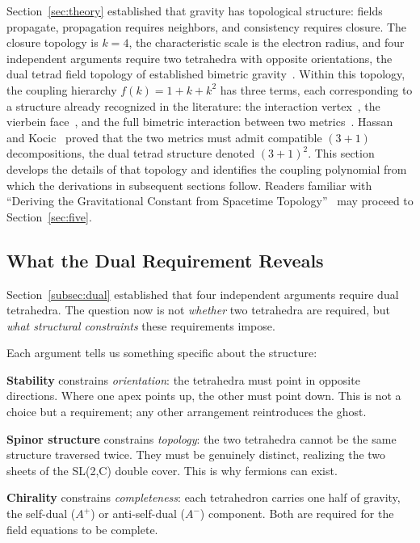 \documentclass[aps,prd,preprint,superscriptaddress,showpacs,preprintnumbers,amsmath,amssymb,nofootinbib]{revtex4-2}
\begin{document}
Section~\ref{sec:theory} established that gravity has topological structure: fields propagate, propagation requires neighbors, and consistency requires closure. The closure topology is $k = 4$, the characteristic scale is the electron radius, and four independent arguments require two tetrahedra with opposite orientations, the dual tetrad field topology of established bimetric gravity~\cite{hassan2012}. Within this topology, the coupling hierarchy $f(k) = 1 + k + k^2$ has three terms, each corresponding to a structure already recognized in the literature: the interaction vertex~\cite{hinterbichler2012}, the vierbein face~\cite{mtw1973}, and the full bimetric interaction between two metrics~\cite{hassan2012}. Hassan and Kocic~\cite{hassankocic2018} proved that the two metrics must admit compatible $(3{+}1)$ decompositions, the dual tetrad structure denoted $(3{+}1)^2$. This section develops the details of that topology and identifies the coupling polynomial from which the derivations in subsequent sections follow. Readers familiar with ``Deriving the Gravitational Constant from Spacetime Topology''~\cite{paper6} may proceed to Section~\ref{sec:five}.

\subsection{What the Dual Requirement Reveals}
\label{subsec:two-tet}

Section~\ref{subsec:dual} established that four independent arguments require dual tetrahedra. The question now is not \emph{whether} two tetrahedra are required, but \emph{what structural constraints} these requirements impose.

Each argument tells us something specific about the structure:

\textbf{Stability} constrains \emph{orientation}: the tetrahedra must point in opposite directions. Where one apex points up, the other must point down. This is not a choice but a requirement; any other arrangement reintroduces the ghost.

\textbf{Spinor structure} constrains \emph{topology}: the two tetrahedra cannot be the same structure traversed twice. They must be genuinely distinct, realizing the two sheets of the SL(2,C) double cover. This is why fermions can exist.

\textbf{Chirality} constrains \emph{completeness}: each tetrahedron carries one half of gravity, the self-dual ($A^+$) or anti-self-dual ($A^-$) component. Both are required for the field equations to be complete.
\end{document}
